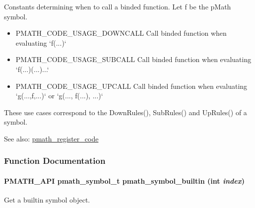 Constants determining when to call a binded function. Let f be the pMath symbol. 

\begin{itemize}
\item PMATH\_\-CODE\_\-USAGE\_\-DOWNCALL Call binded function when evaluating `f(...)`\end{itemize}


\begin{itemize}
\item PMATH\_\-CODE\_\-USAGE\_\-SUBCALL Call binded function when evaluating `f(...)(...)...`\end{itemize}


\begin{itemize}
\item PMATH\_\-CODE\_\-USAGE\_\-UPCALL Call binded function when evaluating `g(...,f,...)` or `g(..., f(...), ...)`\end{itemize}


These use cases correspond to the DownRules(), SubRules() and UpRules() of a symbol.

\begin{Desc}
\item[See also:]\hyperlink{group__symbols_gd02a05fa96992d137b450627486ec0b5}{pmath\_\-register\_\-code} \end{Desc}


\subsubsection{Function Documentation}
\hypertarget{group__symbols_ge9a166b048d04e6ef25632127f0172ba}{
\paragraph[{pmath\_\-symbol\_\-builtin}]{\setlength{\rightskip}{0pt plus 5cm}PMATH\_\-API {\bf pmath\_\-symbol\_\-t} pmath\_\-symbol\_\-builtin (int {\em index})}\hfill}
\label{group__symbols_ge9a166b048d04e6ef25632127f0172ba}


Get a builtin symbol object. 

